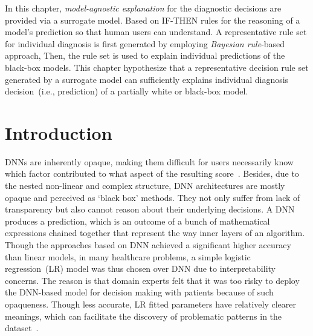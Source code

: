 \hspace*{3.5mm} In this chapter, \textit{model-agnostic explanation} for the diagnostic decisions are provided via a surrogate model. Based on IF-THEN rules for the reasoning of a model's prediction so that human users can understand. %
A representative rule set for individual diagnosis is first generated by employing \textit{Bayesian rule}-based approach, Then, the rule set is used to explain individual predictions of the black-box models. This chapter hypothesize that a representative decision rule set generated by a surrogate model can sufficiently explains individual diagnosis decision~(i.e., prediction) of a partially white or black-box model. 

\section{Introduction} \label{chapter_7:intro}
DNNs are inherently opaque, making them difficult for users necessarily know which factor contributed to what aspect of the resulting score~\cite{ribeiro2018anchors}. Besides, due to the nested non-linear and complex structure, DNN architectures are mostly opaque and perceived as `black box' methods. They not only suffer from lack of transparency but also cannot reason about their underlying decisions. A DNN produces a prediction, which is an outcome of a bunch of mathematical expressions chained together that represent the way inner layers of an algorithm. Though the approaches based on DNN achieved a significant higher accuracy than linear models, in many healthcare problems, a simple logistic regression~(LR) model was thus chosen over DNN due to interpretability concerns. The reason is that domain experts felt that it was too risky to deploy the DNN-based model for decision making with patients because of such opaqueness. Though less accurate, LR fitted parameters have relatively clearer meanings, which can facilitate the discovery of problematic patterns in the dataset~\cite{ming2018rulematrix}. 

